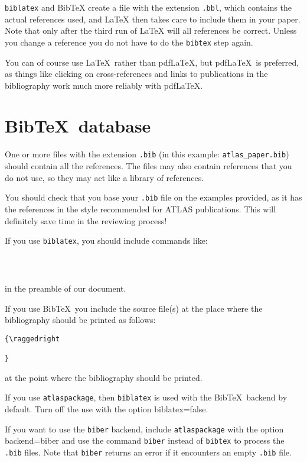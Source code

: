 \documentclass[UKenglish]{latex/atlasdoc}
\newcommand*{\BibTeX}{Bib\TeX}
\newcommand{\File}[1]{\texttt{#1}\xspace}
\newcommand{\Option}[1]{\textsf{#1}\xspace}
\newcommand{\Package}[1]{\texttt{#1}\xspace}
\begin{document}
\Package{biblatex} and \BibTeX{} create a file with the extension \texttt{.bbl}, which
contains the actual references used, and \LaTeX{} then takes care
to include them in your paper. Note that only after the third run of
\LaTeX{} will all references be correct. Unless you change a reference
you do not have to do the \texttt{bibtex} step again.

You can of course use \LaTeX\ rather than pdf\LaTeX, but pdf\LaTeX\ is preferred,
as things like clicking on cross-references and links to publications in the bibliography
work much more reliably with pdf\LaTeX.


\section{\BibTeX\ database}

One or more files with the extension \texttt{.bib} 
(in this example: \texttt{atlas\_paper.bib}) should contain all the references. 
The files may also contain references that you do not use, so they may act like a
library of references. 

You should check that you base your \File{.bib} file on the examples provided,
as it has the references in the style recommended for ATLAS publications.
This will definitely save time in the reviewing process!

If you use \Package{biblatex}, you should include commands like:
%
\begin{verbatim}
  
  
\end{verbatim}
%
in the preamble of our document.

If you use \BibTeX\ you include the source file(s) at the place where the bibliography should be printed as follows:
%
\begin{verbatim}
{\raggedright
  
}
\end{verbatim}
at the point where the bibliography should be printed.

If you use \Package{atlaspackage}, then \Package{biblatex} is used with the \BibTeX\ backend by default.
Turn off the use with the option \Option{biblatex=false}.

If you want to use the \Package{biber} backend, include \Package{atlaspackage} with the option \Option{backend=biber} and
use the command \texttt{biber} instead of \texttt{bibtex} to process the \texttt{.bib} files.
Note that \texttt{biber} returns an error if it encounters an empty \texttt{.bib} file.
\end{document}
